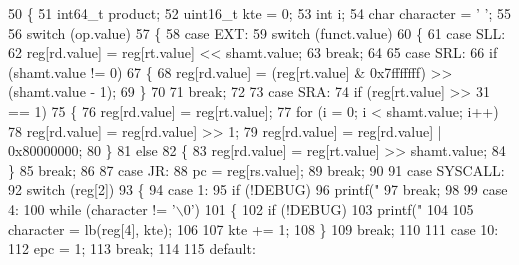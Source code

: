 \begin{DoxyCode}
50 \{
51     int64\_t product;
52     uint16\_t kte = 0;
53     \textcolor{keywordtype}{int} i;
54     \textcolor{keywordtype}{char} character = \textcolor{charliteral}{' '};
55 
56     \textcolor{keywordflow}{switch} (op.value)
57     \{
58     \textcolor{keywordflow}{case} EXT:
59         \textcolor{keywordflow}{switch} (funct.value)
60         \{
61         \textcolor{keywordflow}{case} SLL:
62             reg[rd.value] = reg[rt.value] << shamt.value;
63             \textcolor{keywordflow}{break};
64 
65         \textcolor{keywordflow}{case} SRL:
66             \textcolor{keywordflow}{if} (shamt.value != 0)
67             \{
68                 reg[rd.value] = (reg[rt.value] & 0x7fffffff) >> (shamt.value - 1);
69             \}
70 
71             \textcolor{keywordflow}{break};
72 
73         \textcolor{keywordflow}{case} SRA:
74             \textcolor{keywordflow}{if} (reg[rt.value] >> 31 == 1)
75             \{
76                 reg[rd.value] = reg[rt.value];
77                 \textcolor{keywordflow}{for} (i = 0; i < shamt.value; i++)
78                     reg[rd.value] = reg[rd.value] >> 1;
79                 reg[rd.value] = reg[rd.value] | 0x80000000;
80             \}
81             \textcolor{keywordflow}{else}
82             \{
83                 reg[rd.value] = reg[rt.value] >> shamt.value;
84             \}
85             \textcolor{keywordflow}{break};
86 
87         \textcolor{keywordflow}{case} JR:
88             pc = reg[rs.value];
89             \textcolor{keywordflow}{break};
90 
91         \textcolor{keywordflow}{case} SYSCALL:
92             \textcolor{keywordflow}{switch} (reg[2])
93             \{
94             \textcolor{keywordflow}{case} 1:
95                 \textcolor{keywordflow}{if} (!DEBUG)
96                     printf(\textcolor{stringliteral}{"%
97                 \textcolor{keywordflow}{break};
98 
99             \textcolor{keywordflow}{case} 4:
100                 \textcolor{keywordflow}{while} (character != \textcolor{charliteral}{'\(\backslash\)0'})
101                 \{
102                     \textcolor{keywordflow}{if} (!DEBUG)
103                         printf(\textcolor{stringliteral}{"%
104 
105                     character = lb(reg[4], kte);
106 
107                     kte += 1;
108                 \}
109                 \textcolor{keywordflow}{break};
110 
111             \textcolor{keywordflow}{case} 10:
112                 epc = 1;
113                 \textcolor{keywordflow}{break};
114 
115             \textcolor{keywordflow}{default}:
}}
\end{DoxyCode}
